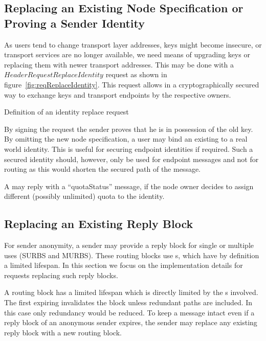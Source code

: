 \subsection{Replacing an Existing Node Specification or Proving a Sender Identity\label{sec:replaceID}}
As users tend to change transport layer addresses, keys might become insecure, or transport services are no longer available, we need means of upgrading keys or replacing them with newer transport addresses. This may be done with a $HeaderRequestReplaceIdentity$ request as shown in figure~\ref{fig:reqReplaceIdentity}. This request allows in a cryptographically secured way to exchange keys and transport endpoints by the respective owners.

\begin{lstfloat}[ht]
	
	\caption{Definition of an identity replace request}
	\label{fig:reqReplaceIdentity}
\end{lstfloat}

By signing the request the sender proves that he is in possession of the old key. By omitting the new node specification, a user may bind an existing  to a real world identity. This is useful for securing endpoint identities if required. Such a secured identity should, however, only be used for endpoint messages and not for routing as this would shorten the secured path of the message.

A \VortexNode{} may reply with a ``quotaStatus'' message, if the node owner decides to assign different (possibly unlimited) quota to the identity. 

\subsection{Replacing an Existing Reply Block\label{sec:replaceMURB}}
For sender anonymity, a sender may provide a reply block for single or multiple uses (SURBS and MURBS). These routing blocks use s, which have by definition a limited lifespan. In this section we focus on the implementation details for requests replacing such reply blocks.

A routing block has a limited lifespan which is directly limited by the s involved. The first expiring  invalidates the block unless redundant paths are included. In this case only redundancy would be reduced. To keep a message intact even if a reply block of an anonymous sender expires, the sender may replace any existing reply block with a new routing block.

